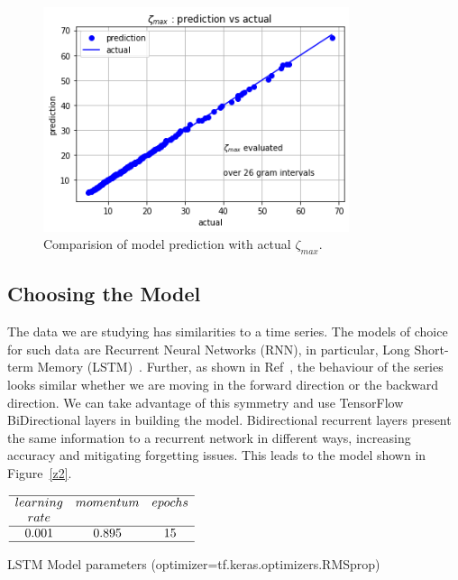 \documentclass[twoside]{article}
\begin{document}
\begin{figure}
\centering
\includegraphics[width=0.8\textwidth]{4.png}
\caption[]{ 
  Comparision of model prediction with actual $\zeta_{max}$. 
  }
\vspace{1mm}
\label{z4}
\end{figure}

\subsection{\label{sec3.1} Choosing the Model}
The data we are studying has similarities to a time series. The models of choice for
such data are Recurrent Neural Networks (RNN), in particular,  
Long Short-term Memory (LSTM)~\cite{lstm}. Further, as shown in Ref~\cite{Shanker 2018a},
the behaviour of the series looks similar whether we are moving in the forward direction 
or the backward direction. We can take advantage of this symmetry and use TensorFlow
BiDirectional layers in building the model.  
Bidirectional recurrent layers present the same information to a recurrent network in different ways, 
increasing accuracy and mitigating forgetting issues.
This leads to the model shown in Figure~\ref{z2}.


\begin{table}
\centering \(\begin{array}{cccccccccccc}

\hline
learning     &momentum  &epochs  \\
rate    &  &  \\
\hline
0.001 &0.895  & 15  \\
\hline
\end{array}\)
\caption{LSTM Model parameters (optimizer=tf.keras.optimizers.RMSprop)}
\label{tab:mean12}
\end{table}
\end{document}

